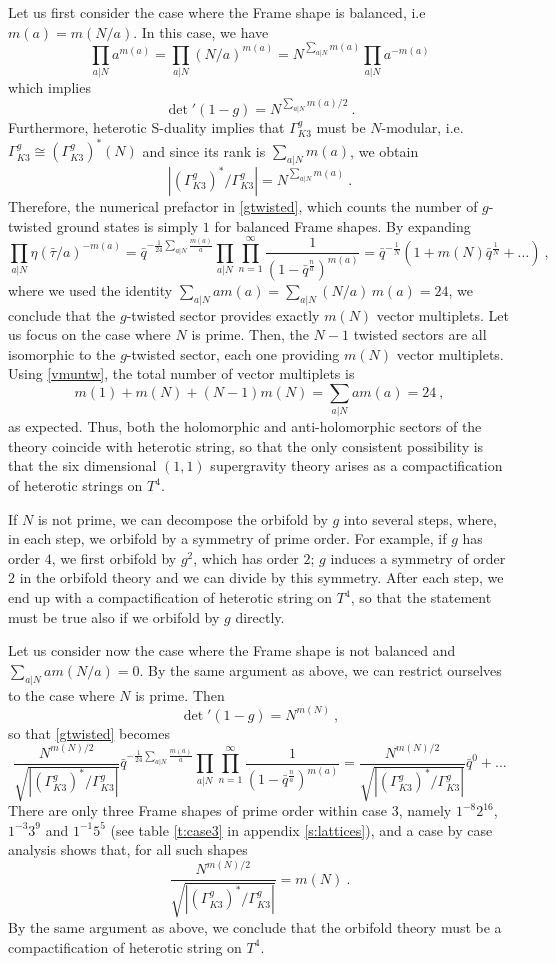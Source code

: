 \documentclass[a4paper,11pt]{article}
\numberwithin{equation}{section}
\def\be{\begin{equation}}
\def\ee{\end{equation}}
\begin{document}
Let us first consider the case where the Frame shape is balanced, i.e $m(a)=m(N/a)$. In this case, we have
\be \prod_{a|N} a^{m(a)}=\prod_{a|N} (N/a)^{m(a)}=N^{\sum_{a|N}m(a)} \prod_{a|N} a^{-m(a)}\ee
which implies
\be \det\nolimits '(1-g)=N^{\sum_{a|N}m(a)/2}\ .
\ee
Furthermore, heterotic S-duality implies that $\Gamma_{K3}^g$ must be $N$-modular, i.e. $\Gamma_{K3}^g\cong (\Gamma_{K3}^g)^*(N)$ and since its rank is $\sum_{a|N}m(a)$, we obtain
\be |(\Gamma_{K3}^g)^*/\Gamma_{K3}^g|=N^{\sum_{a|N}m(a)}\ .
\ee Therefore, the numerical prefactor in \eqref{gtwisted}, which counts the number of $g$-twisted ground states is simply $1$ for balanced Frame shapes. By expanding
\be
\prod_{a|N}\eta(\bar\tau/a)^{-m(a)}=\bar q^{-\frac{1}{24}\sum_{a|N} \frac{m(a)}{a}}\prod_{a|N}\prod_{n=1}^\infty \frac{1}{(1-\bar q^{\frac{n}{a}})^{m(a)}}=\bar q^{-\frac{1}{N}}(1+m(N)\bar q^{\frac{1}{N}}+\ldots)\ ,
\ee where we used the identity $\sum_{a|N} am(a)=\sum_{a|N} (N/a)\, m(a)=24$, we conclude that the $g$-twisted sector provides exactly $m(N)$ vector multiplets. Let us focus on the case where $N$ is prime. Then, the $N-1$ twisted sectors are all isomorphic to the $g$-twisted sector, each one providing $m(N)$ vector multiplets.
Using \eqref{vmuntw}, the total number of vector multiplets is
\be m(1)+m(N)+(N-1)m(N) =\sum_{a|N}a m(a)=24\ ,
\ee as expected. Thus, both the holomorphic and anti-holomorphic sectors of the theory coincide with heterotic string, so that the only consistent possibility is that the six dimensional $(1,1)$ supergravity theory arises as a compactification of heterotic strings on $T^4$.

If $N$ is not prime, we can decompose the orbifold by $g$ into several steps, where, in each step, we orbifold by a symmetry of prime order. For example, if $g$ has order $4$, we first orbifold by $g^2$, which has order $2$; $g$ induces a symmetry of order $2$ in the orbifold theory and we can divide by this symmetry. After each step, we end up with a compactification of heterotic string on $T^4$, so that the statement must be true also if we orbifold by $g$ directly.

\medskip

Let us consider now the case where the Frame shape is not balanced and $\sum_{a|N}am(N/a)=0$. By the same argument as above, we can restrict ourselves to the case where $N$ is prime. Then
\be \det\nolimits '(1-g)=N^{m(N)}\ ,
\ee so that \eqref{gtwisted} becomes
\be \frac{N^{m(N)/2}}{\sqrt{|(\Gamma_{K3}^g)^*/\Gamma_{K3}^g|}}\bar q^{-\frac{1}{24}\sum_{a|N} \frac{m(a)}{a}}\prod_{a|N}\prod_{n=1}^\infty \frac{1}{(1-\bar q^{\frac{n}{a}})^{m(a)}}=\frac{N^{m(N)/2}}{\sqrt{|(\Gamma_{K3}^g)^*/\Gamma_{K3}^g|}}\bar q^0+\ldots
\ee There are only three Frame shapes of prime order within case 3, namely $1^{-8}2^{16}$, $1^{-3}3^9$ and $1^{-1}5^5$ (see table \ref{t:case3} in appendix \ref{s:lattices}), and a case by case analysis shows that, for all such shapes 
\be \frac{N^{m(N)/2}}{\sqrt{|(\Gamma_{K3}^g)^*/\Gamma_{K3}^g|}}=m(N)\ .
\ee By the same argument as above, we conclude that the orbifold theory must be a compactification of heterotic string on $T^4$.
\end{document}
